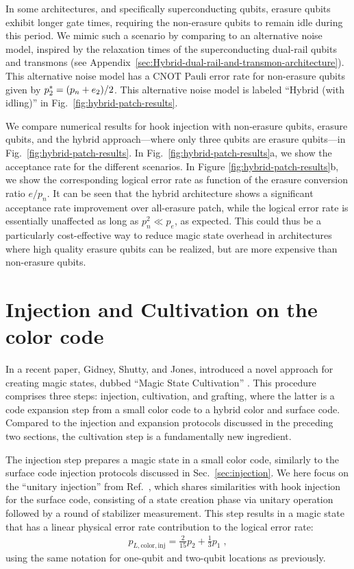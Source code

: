 \documentclass[twocolumn,
notitlepage,
aps,
prx,
floatfix,
superscriptaddress
]{revtex4-2}
\begin{document}
In some architectures, and specifically superconducting qubits, erasure qubits exhibit longer gate times, requiring the non-erasure qubits to remain idle during this period.
We mimic such a scenario by comparing to an alternative noise model, inspired by the relaxation times of the superconducting dual-rail qubits and transmons (see Appendix~\ref{sec:Hybrid-dual-rail-and-transmon-architecture}). 
This alternative noise model has a CNOT Pauli error rate for non-erasure qubits given by
$p_2^* = \qty(p_{n} + e_2)/2$.
This alternative noise model is labeled ``Hybrid (with idling)'' in Fig.~\ref{fig:hybrid-patch-results}.

We compare numerical results for hook injection with non-erasure qubits, erasure qubits, and the hybrid approach---where only three qubits are erasure qubits---in Fig.~\ref{fig:hybrid-patch-results}.
In Fig.~\ref{fig:hybrid-patch-results}a, we show the acceptance rate for the different scenarios.
In Figure \ref{fig:hybrid-patch-results}b, we show the corresponding logical error rate as function of the erasure conversion ratio $e/p_n$. 
It can be seen that the hybrid architecture shows a significant acceptance rate improvement over all-erasure patch, while the logical error rate is essentially unaffected as long as $p_n^2 \ll p_e$, as expected. This could thus be a particularly cost-effective way to reduce magic state overhead in architectures where high quality erasure qubits can be realized, but are more expensive than non-erasure qubits.

\section{Injection and Cultivation on the color code} \label{sec:Cultivation}

In a recent paper, Gidney, Shutty, and Jones, introduced a novel approach for creating magic states, dubbed ``Magic State Cultivation'' \cite{gidney2024magic}. This procedure comprises three steps: injection, cultivation, and grafting, where the latter is a code expansion step from a small color code to a hybrid color and surface code. Compared to the injection and expansion protocols discussed in the preceding two sections, the cultivation step is a fundamentally new ingredient.

The injection step prepares a magic state in a small color code, similarly to the surface code injection protocols discussed in Sec.~\ref{sec:injection}. We here focus on the ``unitary injection'' from Ref.~\cite{gidney2024magic}, which shares similarities with hook injection for the surface code, consisting of a state creation phase via unitary operation followed by a round of stabilizer measurement.
This step results in a magic state that has a linear physical error rate contribution to the logical error rate:
\begin{align}\label{eq:logical-error-rate-color}
    p_{L,\text{color},\text{inj}} = \frac{2}{15}p_2 + \frac{1}{3}p_1 \;,
\end{align}
using the same notation for one-qubit and two-qubit locations as previously.
\end{document}
